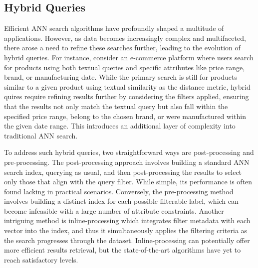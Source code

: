 \documentclass[11pt]{article}
\begin{document}

\subsection{Hybrid Queries}
Efficient ANN search algorithms have profoundly shaped a multitude of applications. However, as data becomes increasingly complex and multifaceted, there arose a need to refine these searches further, leading to the evolution of hybrid queries. 
For instance, consider an e-commerce platform where users search for products using both textual queries and specific attributes like price range, brand, or manufacturing date. While the primary search is still for products similar to a given product using textual similarity as the distance metric, hybrid quires require refining results further by considering the filters applied, ensuring that the results not only match the textual query but also fall within the specified price range, belong to the chosen brand, or were manufactured within the given date range. This introduces an additional layer of complexity into traditional ANN search.  


To address such hybrid queries, two straightforward ways are post-processing and pre-processing. The post-processing approach involves building a standard ANN search index, querying as usual, and then post-processing the results to select only those that align with the query filter. While simple, its performance is often found lacking in practical scenarios. Conversely, the pre-processing method involves building a distinct index for each possible filterable label, which can become infeasible with a large number of attribute constraints. 
Another intriguing method is inline-processing which integrates filter metadata with each vector into the index, and thus it simultaneously applies the filtering criteria as the search progresses through the dataset. Inline-processing can potentially offer more efficient results retrieval, but the state-of-the-art algorithms \cite{DBLP:journals/pvldb/WeiWWLZ0C20, DBLP:conf/osdi/ZhangXCSXCCH00Y23, DBLP:conf/www/GollapudiKSKBRL23} have yet to reach satisfactory levels. 
\end{document}
